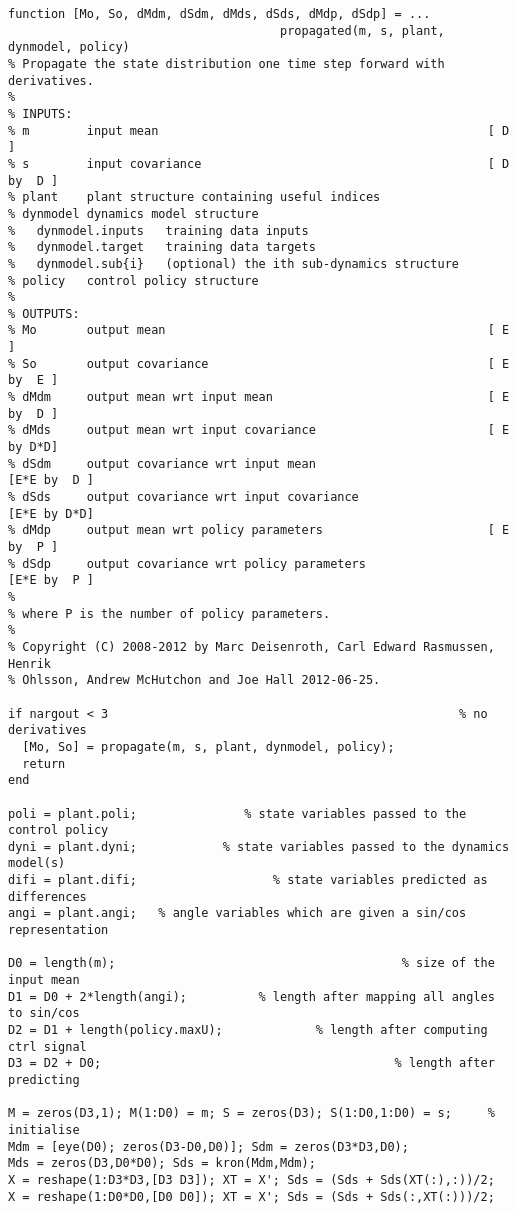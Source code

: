 \begin{lstlisting}
function [Mo, So, dMdm, dSdm, dMds, dSds, dMdp, dSdp] = ...
                                      propagated(m, s, plant, dynmodel, policy)
% Propagate the state distribution one time step forward with derivatives.
%
% INPUTS:
% m        input mean                                              [ D        ]
% s        input covariance                                        [ D  by  D ]
% plant    plant structure containing useful indices
% dynmodel dynamics model structure
%   dynmodel.inputs   training data inputs
%   dynmodel.target   training data targets
%   dynmodel.sub{i}   (optional) the ith sub-dynamics structure
% policy   control policy structure
%
% OUTPUTS:
% Mo       output mean                                             [ E        ]
% So       output covariance                                       [ E  by  E ]
% dMdm     output mean wrt input mean                              [ E  by  D ]
% dMds     output mean wrt input covariance                        [ E  by D*D]
% dSdm     output covariance wrt input mean                        [E*E by  D ]
% dSds     output covariance wrt input covariance                  [E*E by D*D]
% dMdp     output mean wrt policy parameters                       [ E  by  P ]
% dSdp     output covariance wrt policy parameters                 [E*E by  P ]
%
% where P is the number of policy parameters.
%
% Copyright (C) 2008-2012 by Marc Deisenroth, Carl Edward Rasmussen, Henrik
% Ohlsson, Andrew McHutchon and Joe Hall 2012-06-25.

if nargout < 3                                                 % no derivatives
  [Mo, So] = propagate(m, s, plant, dynmodel, policy);
  return
end

poli = plant.poli;               % state variables passed to the control policy
dyni = plant.dyni;            % state variables passed to the dynamics model(s)
difi = plant.difi;                   % state variables predicted as differences
angi = plant.angi;   % angle variables which are given a sin/cos representation

D0 = length(m);                                        % size of the input mean
D1 = D0 + 2*length(angi);          % length after mapping all angles to sin/cos
D2 = D1 + length(policy.maxU);             % length after computing ctrl signal
D3 = D2 + D0;                                         % length after predicting

M = zeros(D3,1); M(1:D0) = m; S = zeros(D3); S(1:D0,1:D0) = s;     % initialise
Mdm = [eye(D0); zeros(D3-D0,D0)]; Sdm = zeros(D3*D3,D0);
Mds = zeros(D3,D0*D0); Sds = kron(Mdm,Mdm);
X = reshape(1:D3*D3,[D3 D3]); XT = X'; Sds = (Sds + Sds(XT(:),:))/2;
X = reshape(1:D0*D0,[D0 D0]); XT = X'; Sds = (Sds + Sds(:,XT(:)))/2;


\end{lstlisting}
